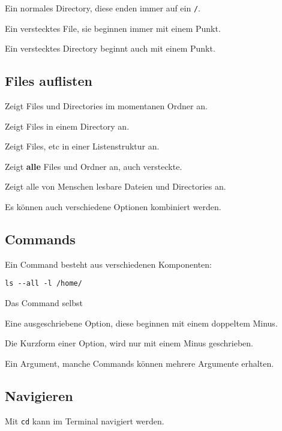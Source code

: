 \documentclass{article}
\begin{document}
Ein normales Directory, diese enden immer auf ein \texttt{/}.

Ein verstecktes File, sie beginnen immer mit einem Punkt.

Ein verstecktes Directory beginnt auch mit einem Punkt.

\subsection{Files auflisten}
Zeigt Files und Directories im momentanen Ordner an.

Zeigt Files in einem Directory an.

Zeigt Files, etc in einer Listenstruktur an.

Zeigt \textbf{alle} Files und Ordner an, auch versteckte.

Zeigt alle von Menschen lesbare Dateien und Directories an.

Es können auch verschiedene Optionen kombiniert werden.

\subsection{Commands}
Ein Command besteht aus verschiedenen Komponenten:

\begin{verbatim}
ls --all -l /home/
\end{verbatim}

 Das Command selbst

Eine ausgeschriebene Option, diese beginnen mit einem doppeltem Minus.

Die Kurzform einer Option, wird nur mit einem Minus geschrieben.

Ein Argument, manche Commands können mehrere Argumente erhalten.

\subsection{Navigieren}
Mit \texttt{cd} kann im Terminal navigiert werden.
\end{document}
